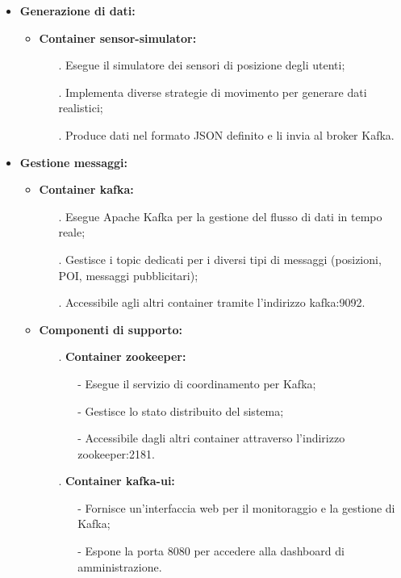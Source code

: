 \documentclass[10pt]{article}
\begin{document}
\begin{itemize}
    \item \textbf{Generazione di dati:}
    \begin{itemize}
        \item \textbf{Container sensor-simulator:}
        \begin{itemize}
            \item[.] Esegue il simulatore dei sensori di posizione degli utenti;
            \item[.] Implementa diverse strategie di movimento per generare dati realistici;
            \item[.] Produce dati nel formato JSON definito e li invia al broker Kafka.
        \end{itemize}
    \end{itemize}

    \item \textbf{Gestione messaggi:}
    \begin{itemize}
        \item \textbf{Container kafka:}
        \begin{itemize}
            \item[.] Esegue Apache Kafka per la gestione del flusso di dati in tempo reale;
            \item[.] Gestisce i topic dedicati per i diversi tipi di messaggi (posizioni, POI, messaggi pubblicitari);
            \item[.] Accessibile agli altri container tramite l'indirizzo kafka:9092.
        \end{itemize}
        \item \textbf{Componenti di supporto:}
        \begin{itemize}
            \item[.] \textbf{Container zookeeper:}
            \begin{itemize}
                \item[-] Esegue il servizio di coordinamento per Kafka;
                \item[-] Gestisce lo stato distribuito del sistema;
                \item[-] Accessibile dagli altri container attraverso l'indirizzo zookeeper:2181.
            \end{itemize}
            \item[.] \textbf{Container kafka-ui:}
            \begin{itemize}
                \item[-] Fornisce un'interfaccia web per il monitoraggio e la gestione di Kafka;
                \item[-] Espone la porta 8080 per accedere alla dashboard di amministrazione.
            \end{itemize}
        \end{itemize}
    \end{itemize}


\end{itemize}
\end{document}
